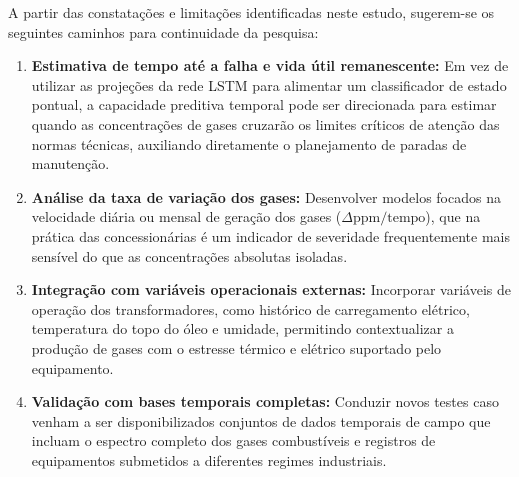 A partir das constatações e limitações identificadas neste estudo, sugerem-se os seguintes caminhos para continuidade da pesquisa:

\begin{enumerate}
    \item \textbf{Estimativa de tempo até a falha e vida útil remanescente:} Em vez de utilizar as projeções da rede LSTM para alimentar um classificador de estado pontual, a capacidade preditiva temporal pode ser direcionada para estimar quando as concentrações de gases cruzarão os limites críticos de atenção das normas técnicas, auxiliando diretamente o planejamento de paradas de manutenção.
    \item \textbf{Análise da taxa de variação dos gases:} Desenvolver modelos focados na velocidade diária ou mensal de geração dos gases ($\Delta\text{ppm}/\text{tempo}$), que na prática das concessionárias é um indicador de severidade frequentemente mais sensível do que as concentrações absolutas isoladas.
    \item \textbf{Integração com variáveis operacionais externas:} Incorporar variáveis de operação dos transformadores, como histórico de carregamento elétrico, temperatura do topo do óleo e umidade, permitindo contextualizar a produção de gases com o estresse térmico e elétrico suportado pelo equipamento.
    \item \textbf{Validação com bases temporais completas:} Conduzir novos testes caso venham a ser disponibilizados conjuntos de dados temporais de campo que incluam o espectro completo dos gases combustíveis e registros de equipamentos submetidos a diferentes regimes industriais.
\end{enumerate}
